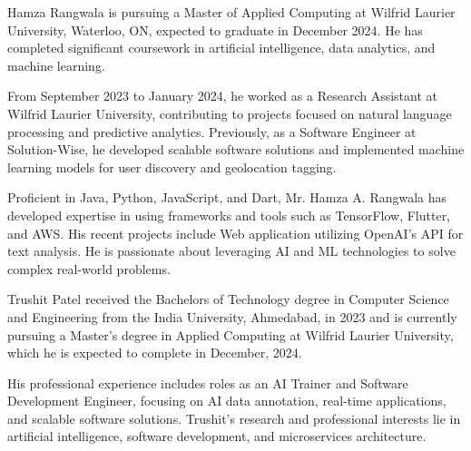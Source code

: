 \documentclass{ieeeaccess}
\begin{document}
\begin{IEEEbiography}{Hamza Rangwala} is pursuing a Master of Applied Computing at Wilfrid Laurier University, Waterloo, ON, expected to graduate in December 2024. He has completed significant coursework in artificial intelligence, data analytics, and machine learning.
	
	From September 2023 to January 2024, he worked as a Research Assistant at Wilfrid Laurier University, contributing to projects focused on natural language processing and predictive analytics. Previously, as a Software Engineer at Solution-Wise, he developed scalable software solutions and implemented machine learning models for user discovery and geolocation tagging. 
	
	Proficient in Java, Python, JavaScript, and Dart, Mr. Hamza A. Rangwala has developed expertise in using frameworks and tools such as TensorFlow, Flutter, and AWS. His recent projects include Web application utilizing OpenAI's API for text analysis. He is passionate about leveraging AI and ML technologies to solve complex real-world problems.
\end{IEEEbiography}


\begin{IEEEbiography}{Trushit Patel} received the Bachelors of Technology degree in Computer Science and Engineering from the India University, Ahmedabad, in 2023 and is currently pursuing a Master's degree in Applied Computing at Wilfrid Laurier University, which he is expected to complete in December, 2024.
	
	His professional experience includes roles as an AI Trainer and Software Development Engineer, focusing on AI data annotation, real-time applications, and scalable software solutions. Trushit's research and professional interests lie in artificial intelligence, software development, and microservices architecture.
	
\end{IEEEbiography}

\EOD
\end{document}
